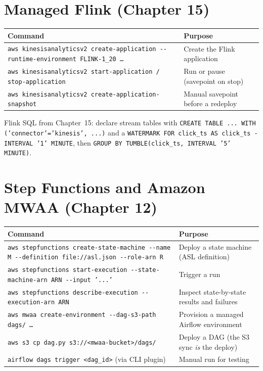 \section{Managed Flink (Chapter 15)}
%

\begin{center}
\footnotesize
\begin{tabular}{@{}p{7.2cm}p{7.6cm}@{}}
\toprule
\textbf{Command} & \textbf{Purpose} \\
\midrule
\texttt{aws kinesisanalyticsv2 create-application -{}-runtime-environment FLINK-1\_20 \dots} & Create the Flink application \\
\texttt{aws kinesisanalyticsv2 start-application / stop-application} & Run or pause (savepoint on stop) \\
\texttt{aws kinesisanalyticsv2 create-application-snapshot} & Manual savepoint before a redeploy \\
\bottomrule
\end{tabular}
\end{center}

\noindent Flink SQL from Chapter~15: declare stream tables with \texttt{CREATE TABLE ... WITH
('connector'='kinesis', ...)} and a \texttt{WATERMARK FOR click\_ts AS click\_ts - INTERVAL '1'
MINUTE}, then \texttt{GROUP BY TUMBLE(click\_ts, INTERVAL '5' MINUTE)}.

\section{Step Functions and Amazon MWAA (Chapter 12)}
%

\begin{center}
\footnotesize
\begin{tabular}{@{}p{7.2cm}p{7.6cm}@{}}
\toprule
\textbf{Command} & \textbf{Purpose} \\
\midrule
\texttt{aws stepfunctions create-state-machine -{}-name M -{}-definition file://asl.json -{}-role-arn R} & Deploy a state machine (ASL definition) \\
\texttt{aws stepfunctions start-execution -{}-state-machine-arn ARN -{}-input '{...}'} & Trigger a run \\
\texttt{aws stepfunctions describe-execution -{}-execution-arn ARN} & Inspect state-by-state results and failures \\
\texttt{aws mwaa create-environment -{}-dag-s3-path dags/ \dots} & Provision a managed Airflow environment \\
\texttt{aws s3 cp dag.py s3://<mwaa-bucket>/dags/} & Deploy a DAG (the S3 sync \emph{is} the deploy) \\
\texttt{airflow dags trigger <dag\_id>} (via CLI plugin) & Manual run for testing \\
\bottomrule
\end{tabular}
\end{center}

